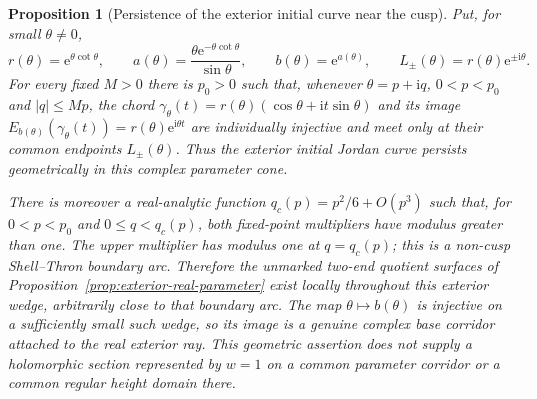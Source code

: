 \documentclass[11pt]{amsart}
\newtheorem{proposition}[theorem]{Proposition}
\theoremstyle{definition}
\newcommand{\eee}{\mathrm{e}}
\newcommand{\ii}{\mathrm{i}}
\begin{document}
\begin{proposition}[Persistence of the exterior initial curve near the cusp]
\label{prop:exterior-curve-collar}
Put, for small $\theta\ne0$,
\[
 r(\theta)=\eee^{\theta\cot\theta},\qquad
 a(\theta)=\frac{\theta\eee^{-\theta\cot\theta}}{\sin\theta},
 \qquad b(\theta)=\eee^{a(\theta)},\qquad
 L_\pm(\theta)=r(\theta)\eee^{\pm\ii\theta}.
\]
For every fixed $M>0$ there is $p_0>0$ such that, whenever
$\theta=p+\ii q$, $0<p<p_0$ and $|q|\le Mp$, the chord
$\gamma_\theta(t)=r(\theta)(\cos\theta+\ii t\sin\theta)$ and its
image $E_{b(\theta)}(\gamma_\theta(t))=r(\theta)\eee^{\ii\theta t}$
are individually injective and meet only at their common endpoints
$L_\pm(\theta)$.  Thus the exterior initial Jordan curve persists
geometrically in this complex parameter cone.

There is moreover a real-analytic function
$q_c(p)=p^2/6+O(p^3)$ such that, for $0<p<p_0$ and
$0\le q<q_c(p)$, both fixed-point multipliers have modulus greater
than one.  The upper multiplier has modulus one at $q=q_c(p)$;
this is a non-cusp Shell--Thron boundary arc.  Therefore the
unmarked two-end quotient surfaces of
Proposition~\ref{prop:exterior-real-parameter} exist locally throughout
this exterior wedge, arbitrarily close to that boundary arc.  The map
$\theta\mapsto b(\theta)$ is injective on a sufficiently small such
wedge, so its image is a genuine complex base corridor attached to
the real exterior ray.  This
geometric assertion does not supply a holomorphic section represented
by $w=1$ on a common parameter corridor or a common regular height
domain there.
\end{proposition}
\end{document}
